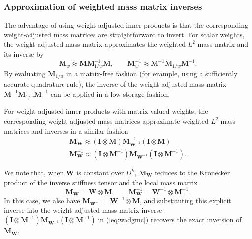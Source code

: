 \documentclass{siamart0216}
\newcommand{\LRp}[1]{\left( #1 \right)}
\begin{document}

\subsubsection{Approximation of weighted mass matrix inverses}

The advantage of using weight-adjusted inner products is that the corresponding weight-adjusted mass matrices are straightforward to invert.  For scalar weights, the weight-adjusted mass matrix approximates the weighted $L^2$ mass matrix and its inverse by
\[
\bm{M}_w \approx \bm{M}\bm{M}^{-1}_{1/w}\bm{M}, \qquad \bm{M}^{-1}_w \approx \bm{M}^{-1}\bm{M}_{1/w}\bm{M}^{-1}.
\]
By evaluating $\bm{M}_{1/w}$ in a matrix-free fashion (for example, using a sufficiently accurate quadrature rule), the inverse of the weight-adjusted mass matrix $\bm{M}^{-1}\bm{M}_{1/w}\bm{M}^{-1}$ can be applied in a low storage fashion.  

For weight-adjusted inner products with matrix-valued weights, the corresponding weight-adjusted mass matrices approximate weighted $L^2$ mass matrices and inverses in a similar fashion
\begin{align}
\bm{M}_{\bm{W}} \approx \LRp{\bm{I} \otimes \bm{M}} \bm{M}^{-1}_{\bm{W}^{-1}} \LRp{\bm{I} \otimes \bm{M}} \nonumber\\
\bm{M}_{\bm{W}}^{-1} \approx \LRp{\bm{I} \otimes \bm{M}^{-1}} \bm{M}_{\bm{W}^{-1}} \LRp{\bm{I} \otimes \bm{M}^{-1}}.
\label{eq:wadgmc}
\end{align}

We note that, when $\bm{W}$ is constant over $D^k$, $\bm{M}_{\bm{W}}$ reduces to the Kronecker product of the inverse stiffness tensor and the local mass matrix 
\[
\bm{M}_{\bm{W}} = \bm{W}\otimes \bm{M}, \qquad \bm{M}_{\bm{W}}^{-1} = \bm{W}^{-1}\otimes \bm{M}^{-1}.
\] 
In this case, we also have $\bm{M}_{\bm{W}^{-1}} = \bm{W}^{-1}\otimes \bm{M}$, and substituting this explicit inverse into the weight adjusted mass matrix inverse $\LRp{\bm{I} \otimes \bm{M}^{-1}} \bm{M}_{\bm{W}^{-1}} \LRp{\bm{I} \otimes \bm{M}^{-1}}$ in (\ref{eq:wadgmc}) recovers the exact inversion of $\bm{M}_{\bm{W}}$.  
\end{document}

